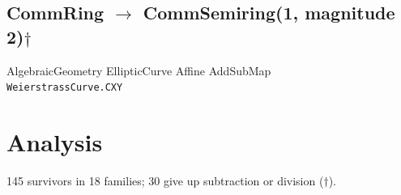 \documentclass[10pt,a4paper]{article}
\begin{document}
\subsection*{CommRing $\to$ CommSemiring\quad\textmd{\small (1, magnitude 2)\;$\dagger$}}
{\footnotesize\color{locator}AlgebraicGeometry\,\textperiodcentered\,EllipticCurve\,\textperiodcentered\,Affine\,\textperiodcentered\,AddSubMap}\\
\hspace*{1em}\texttt{\small WeierstrassCurve.\allowbreak{}CXY}\\
\hspace*{2em}{\footnotesize\itshape signature not resolved}

\clearpage
\section{Analysis}
145 survivors in 18 families; 30 give up subtraction or division ($\dagger$).
\end{document}
